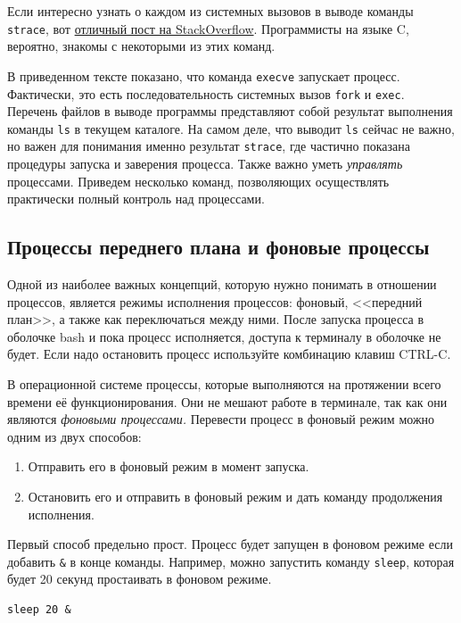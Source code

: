 \documentclass[a4paper,12pt,final,openany]{extbook}
\providecommand{\tightlist}{%
  \setlength{\itemsep}{0pt}\setlength{\parskip}{0pt}}
\begin{document}
Если интересно узнать о каждом из системных вызовов в
выводе команды \texttt{strace}, вот
\href{https://stackoverflow.com/a/6334557}{отличный пост на
StackOverflow}. Программисты на языке C, вероятно, знакомы с некоторыми
из этих команд.

В приведенном тексте показано, что команда \texttt{execve} запускает
процесс. Фактически, это есть последовательность системных вызов \texttt{fork} и \texttt{exec}.
Перечень файлов в выводе программы представляют собой
результат выполнения команды \texttt{ls} в текущем каталоге.
На самом деле, что выводит \texttt{ls} сейчас не важно, но важен для понимания
именно результат \texttt{strace}, где частично показана процедуры запуска и заверения процесса. Также важно уметь \emph{управлять}
процессами. Приведем несколько команд, позволяющих осуществлять практически полный
контроль над процессами.

\hypertarget{Foreground-vs-Background-Processes}{%
\subsection{\texorpdfstring{\protect\hyperlink{Foreground-vs-Background-Processes}{}Процессы
переднего плана и фоновые
процессы}{Процессы переднего плана и фоновые процессы}}\label{Foreground-vs-Background-Processes}}

Одной из наиболее важных концепций, которую нужно понимать в отношении
процессов, является режимы исполнения процессов: фоновый, <<передний план>>, а также как
переключаться между ними. После запуска процесса в оболочке bash и пока
процесс исполняется, доступа к терминалу в оболочке не будет. Если надо остановить
процесс используйте комбинацию клавиш CTRL-C.

В операционной системе процессы, которые
выполняются на протяжении всего времени её функционирования. Они не мешают работе в терминале, так как они являются \emph{фоновыми процессами.}
Перевести процесс в фоновый режим можно одним из двух способов:
\begin{enumerate}
\tightlist
\item
  Отправить его в фоновый режим в момент запуска.
\item
  Остановить его и отправить в фоновый режим и дать команду продолжения
  исполнения.
\end{enumerate}

Первый способ предельно прост. Процесс будет запущен в фоновом режиме если
добавить \texttt{\&} в конце команды. Например, можно запустить команду
\texttt{sleep}, которая будет 20 секунд простаивать в фоновом режиме.
\begin{verbatim}
sleep 20 &
\end{verbatim}
\end{document}
